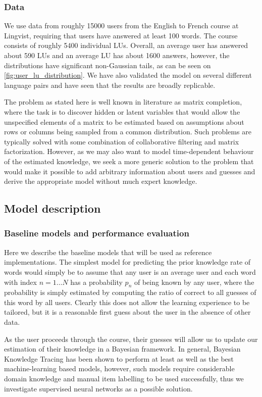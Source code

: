 \subsubsection{Data}
We use data from roughly 15000 users from the English to French course at Lingvist, requiring that users have answered at least 100 words. The course consists of roughly 5400 individual LUs. Overall, an average user has answered about 590 LUs and an average LU has about 1600 answers, however, the distributions have significant non-Gaussian tails, as can be seen on \cref{fig:user_lu_distribution}. We have also validated the model on several different language pairs and have seen that the results are broadly replicable.

The problem as stated here is well known in literature as matrix completion\cite{candes2009exact}, where the task is to discover hidden or latent variables that would allow the unspecified elements of a matrix to be estimated based on assumptions about rows or columns being sampled from a common distribution. Such problems are typically solved with some combination of collaborative filtering and matrix factorization. However, as we may also want to model time-dependent behaviour of the estimated knowledge, we seek a more generic solution to the problem that would make it possible to add arbitrary information about users and guesses and derive the appropriate model without much expert knowledge.

\subsection{Model description}

\subsubsection{Baseline models and performance evaluation}

Here we describe the baseline models that will be used as reference implementations. The simplest model for predicting the prior knowledge rate of words would simply be to assume that any user is an average user and each word with index $n=1 \dots N$ has a probability $p_n$ of being known by any user, where the probability is simply estimated by computing the ratio of correct to all guesses of this word by all users. Clearly this does not allow the learning experience to be tailored, but it is a reasonable first guess about the user in the absence of other data.

As the user proceeds through the course, their guesses will allow us to update our estimation of their knowledge in a Bayesian framework. In general, Bayesian Knowledge Tracing \cite{corbett1994knowledge} has been shown to perform at least as well as the best machine-learning based models, however, such models require considerable domain knowledge and manual item labelling to be used successfully\cite{khajah2016deep}, thus we investigate supervised neural networks as a possible solution.

